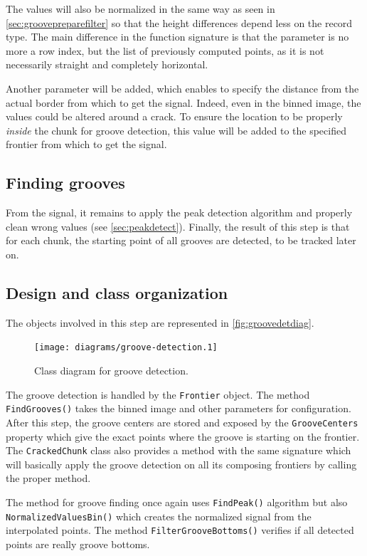 The values will also be normalized in the same way as seen in \autoref{sec:groovepreparefilter} so that the height differences depend less on the record type. The main difference in the function signature is that the parameter is no more a row index, but the list of previously computed points, as it is not necessarily straight and completely horizontal.

Another parameter will be added, which enables to specify the distance from the actual border from which to get the signal. Indeed, even in the binned image, the values could be altered around a crack. To ensure the location to be properly \emph{inside} the chunk for groove detection, this value will be added to the specified frontier from which to get the signal.

\subsection{Finding grooves}

From the signal, it remains to apply the peak detection algorithm and properly clean wrong values (see \autoref{sec:peakdetect}). Finally, the result of this step is that for each chunk, the starting point of all grooves are detected, to be tracked later on.

\subsection{Design and class organization}

The objects involved in this step are represented in \autoref{fig:groovedetdiag}.

\begin{figure}[!ht]
\centering
\texttt{[image: diagrams/groove-detection.1]}
\caption{Class diagram for groove detection.}
\label{fig:groovedetdiag}
\end{figure}

The groove detection is handled by the \texttt{Frontier} object. The method \texttt{FindGrooves()} takes the binned image and other parameters for configuration. After this step, the groove centers are stored and exposed by the \texttt{GrooveCenters} property which give the exact points where the groove is starting on the frontier. The \texttt{CrackedChunk} class also provides a method with the same signature which will basically apply the groove detection on all its composing frontiers by calling the proper method.

The method for groove finding once again uses \texttt{FindPeak()} algorithm but also \texttt{NormalizedValuesBin()} which creates the normalized signal from the interpolated points. The method \texttt{FilterGrooveBottoms()} verifies if all detected points are really groove bottoms.

